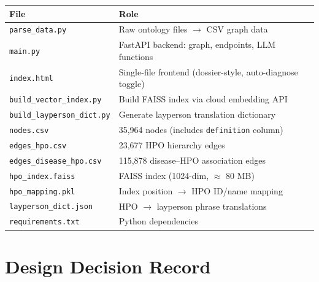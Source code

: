 \documentclass[11pt,a4paper]{article}
\begin{document}
\begin{table}[H]
\centering
\begin{tabular}{@{}ll@{}}
\toprule
\textbf{File} & \textbf{Role} \\
\midrule
\texttt{parse\_data.py} & Raw ontology files $\rightarrow$ CSV graph data \\
\texttt{main.py} & FastAPI backend: graph, endpoints, LLM functions \\
\texttt{index.html} & Single-file frontend (dossier-style, auto-diagnose toggle) \\
\texttt{build\_vector\_index.py} & Build FAISS index via cloud embedding API \\
\texttt{build\_layperson\_dict.py} & Generate layperson translation dictionary \\
\texttt{nodes.csv} & 35,964 nodes (includes \texttt{definition} column) \\
\texttt{edges\_hpo.csv} & 23,677 HPO hierarchy edges \\
\texttt{edges\_disease\_hpo.csv} & 115,878 disease–HPO association edges \\
\texttt{hpo\_index.faiss} & FAISS index (1024-dim, $\approx$ 80 MB) \\
\texttt{hpo\_mapping.pkl} & Index position $\rightarrow$ HPO ID/name mapping \\
\texttt{layperson\_dict.json} & HPO $\rightarrow$ layperson phrase translations \\
\texttt{requirements.txt} & Python dependencies \\
\bottomrule
\end{tabular}
\end{table}

\newpage

\section{Design Decision Record}
\end{document}
